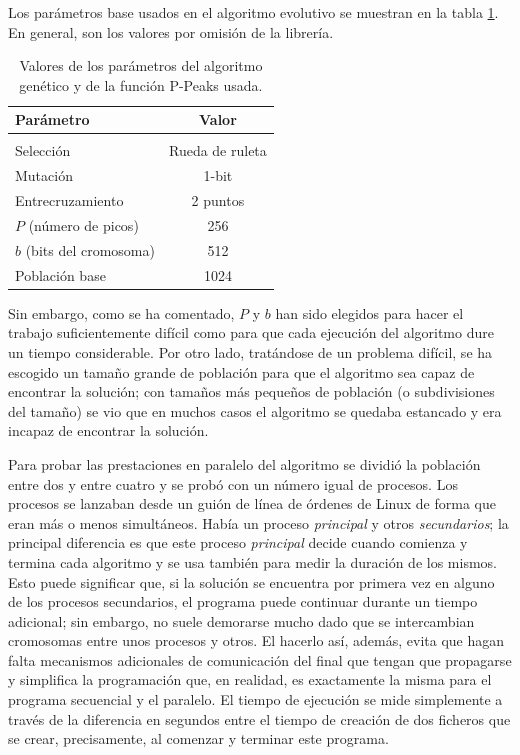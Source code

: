 \documentclass{article}
\begin{document}
Los parámetros base usados en el algoritmo evolutivo se muestran en la
tabla \ref{tab:params}. En general, son los valores por omisión de la
librería.  
%
\begin{table}[t!]
\centering 
\caption{Valores de los parámetros del algoritmo genético y de la
  función P-Peaks usada. \label{tab:params}}
\begin{tabular}{lc}
\hline
Parámetro & Valor \\
\hline \\
Selección & Rueda de ruleta \\
Mutación & 1-bit \\
Entrecruzamiento & 2 puntos \\
$P$ (número de picos)  & 256 \\
$b$ (bits del cromosoma)   & 512 \\ 
Población base & 1024 \\
\hline
\end{tabular}
\end{table}
%
Sin embargo, como se ha comentado, $P$ y $b$ han sido elegidos para
hacer el trabajo suficientemente difícil como para que cada ejecución
del algoritmo dure un tiempo considerable. Por otro lado, tratándose
de un problema difícil, se ha escogido un tamaño grande de población
para que el algoritmo sea capaz de encontrar la solución; con tamaños
más pequeños de población (o subdivisiones del tamaño) se vio que en
muchos casos el algoritmo se quedaba estancado y era incapaz de
encontrar la solución.

Para probar las prestaciones en paralelo del algoritmo se dividió la
población entre dos y entre cuatro y se probó con un número igual de
procesos. Los procesos se lanzaban desde un guión de línea de órdenes  %
de Linux de forma que eran más o menos simultáneos. Había un proceso
{\em principal} y otros {\em secundarios}; la principal diferencia es
que este proceso {\em principal} decide cuando comienza y termina cada
algoritmo y se usa también para medir la duración de los mismos. Esto
puede significar que, si la solución se encuentra por primera vez en
alguno de los procesos secundarios, el programa puede continuar
durante un tiempo adicional; sin embargo, no suele demorarse mucho
dado que se intercambian cromosomas entre unos procesos y otros. El
hacerlo así, además, evita que hagan falta mecanismos adicionales de
comunicación del final que tengan que propagarse y simplifica la
programación que, en realidad, es exactamente la misma para el
programa secuencial y el paralelo. El tiempo de ejecución se mide
simplemente a través de la diferencia en segundos entre el tiempo de
creación de dos ficheros que se crear, precisamente, al comenzar y
terminar este programa. 
\end{document}

